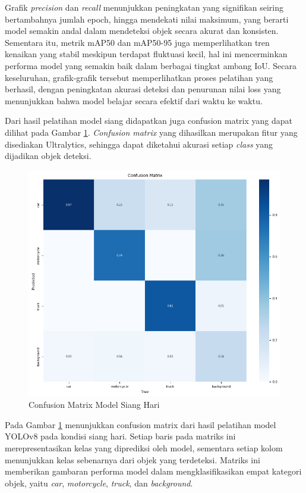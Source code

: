 Grafik \emph{precision} dan \emph{recall} menunjukkan peningkatan yang signifikan seiring bertambahnya jumlah epoch, hingga mendekati nilai maksimum, yang berarti model semakin andal dalam mendeteksi objek secara akurat dan konsisten. Sementara itu, metrik mAP50 dan mAP50-95 juga memperlihatkan tren kenaikan yang stabil meskipun terdapat fluktuasi kecil, hal ini mencerminkan performa model yang semakin baik dalam berbagai tingkat ambang IoU. Secara keseluruhan, grafik-grafik tersebut memperlihatkan proses pelatihan yang berhasil, dengan peningkatan akurasi deteksi dan penurunan nilai loss yang menunjukkan bahwa model belajar secara efektif dari waktu ke waktu.

Dari hasil pelatihan model siang didapatkan juga confusion matrix yang dapat dilihat pada Gambar \ref{fig:confusion matrix siang}. \emph{Confusion matrix} yang dihasilkan merupakan fitur yang disediakan Ultralytics, sehingga dapat diketahui akurasi setiap \emph{class} yang dijadikan objek deteksi.

\begin{figure} [H] \centering
  \includegraphics[scale=0.8]{bab4/confusion_siang.png}
  \caption{Confusion Matrix Model Siang Hari}
  \label{fig:confusion matrix siang}
\end{figure}
Pada Gambar \ref{fig:confusion matrix siang} menunjukkan confusion matrix dari hasil pelatihan model YOLOv8 pada kondisi siang hari. Setiap baris pada matriks ini merepresentasikan kelas yang diprediksi oleh model, sementara setiap kolom menunjukkan kelas sebenarnya dari objek yang terdeteksi. Matriks ini memberikan gambaran performa model dalam mengklasifikasikan empat kategori objek, yaitu \emph{car}, \emph{motorcycle}, \emph{truck}, dan \emph{background}.


